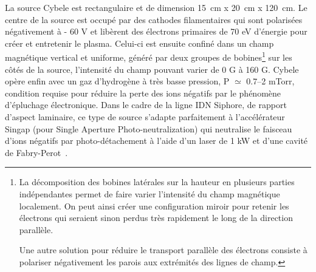 \begin{refsection}
La source Cybele est rectangulaire et de dimension 
15~cm x 20~cm x 120~cm. Le centre de la source est
occupé par des cathodes filamentaires qui sont polarisées négativement à - 60 V
et libèrent des électrons primaires de 70 eV
d'énergie pour créer et entretenir le plasma.
Celui-ci est ensuite confiné dans un champ magnétique vertical et uniforme, généré par deux
groupes de bobines\footnote{La décomposition des bobines
latérales sur la hauteur en plusieurs parties indépendantes permet de faire
varier l'intensité du champ magnétique localement. On peut ainsi créer une
configuration miroir pour retenir les électrons qui seraient sinon perdus très
rapidement le long de la direction parallèle. 

Une autre solution pour réduire
le transport parallèle des électrons consiste à polariser négativement les
parois aux extrémités des lignes de champ.} sur les côtés de la source,
l'intensité du champ pouvant varier de 0 G à 160 G. Cybele opère enfin avec un
gaz d'hydrogène à très basse pression, P $\simeq$ 0.7--2 mTorr, condition
requise pour réduire la perte des ions négatifs par le phénomène d'épluchage
électronique. Dans le cadre de la
ligne IDN Siphore, de rapport d'aspect laminaire, ce type de
source s'adapte parfaitement à l'accélérateur Singap (pour Single Aperture
Photo-neutralization) qui neutralise le faisceau d'ions négatifs
par photo-détachement à l'aide d'un laser de 1 kW et d'une cavité de
Fabry-Perot~\parencite{SimoninHDR}.


\end{refsection}
